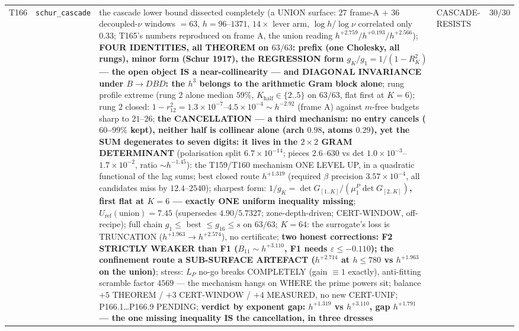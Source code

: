 \documentclass[11pt,a4paper]{article}
\begin{document}
{\begin{xltabular}{\linewidth}{@{}p{0.95cm} >{\raggedright\arraybackslash}p{3.1cm} Y >{\raggedright\scriptsize\arraybackslash}p{3.35cm} p{1.15cm}@{}}
T166 & \texttt{\scriptsize schur\_\allowbreak cascade} & the cascade lower bound dissected completely (a UNION surface: $27$ frame-A $+$ $36$ decoupled-$\nu$ windows $=63$, $h=96$--$1371$, $14\times$ lever arm, $\log h$/$\log\nu$ correlated only $0.33$; T165's numbers reproduced on frame A, the union reading $h^{+2.759}/h^{+0.193}/h^{+2.566}$); \textbf{FOUR IDENTITIES, all THEOREM on $63/63$: prefix (one Cholesky, all rungs), minor form (Schur 1917), the REGRESSION form $g_K/g_1=1/(1-R_K^2)$ --- the open object IS a near-collinearity --- and DIAGONAL INVARIANCE under $B\to DBD$: the $h^3$ belongs to the arithmetic Gram block alone}; rung profile extreme (rung $2$ alone median $59\%$, $K_{\mathrm{half}}\in\{2..5\}$ on $63/63$, flat first at $K=6$); rung $2$ closed: $1-r_{12}^2=1.3\times10^{-7}$--$4.5\times10^{-4}\sim h^{-2.92}$ (frame A) against $m$-free budgets sharp to $21$--$26$; \textbf{the CANCELLATION --- a third mechanism: no entry cancels ($60$--$99\%$ kept), neither half is collinear alone (arch $0.98$, atoms $0.29$), yet the SUM degenerates to seven digits: it lives in the $2\times2$ GRAM DETERMINANT} (polarisation split $6.7\times10^{-14}$; pieces $2.6$--$630$ vs det $1.0\times10^{-3}$--$1.7\times10^{-2}$, ratio $\sim h^{-1.45}$): the T159/T160 mechanism ONE LEVEL UP, in a quadratic functional of the lag sums; best closed route $h^{+1.319}$ (required $\beta$ precision $3.57\times10^{-4}$, all candidates miss by $12.4$--$2540$); sharpest form: \textbf{$1/g_K=\det G_{[1..K]}/(\mu^P_1\det G_{[2..K]})$, first flat at $K=6$ --- exactly ONE uniform inequality missing}; $U_{\mathrm{ref}}(\text{union})=7.45$ (supersedes $4.90$/$5.7327$; zone-depth-driven; CERT-WINDOW, off-recipe); full chain $g_1\le$ best $\le g_{16}\le s$ on $63/63$; $K=64$: the surrogate's loss is TRUNCATION ($h^{+1.963}\to h^{+2.574}$), no certificate; \textbf{two honest corrections: F2 STRICTLY WEAKER than F1 ($B_{11}\sim h^{+3.110}$, F1 needs $\varepsilon\le-0.110$); the confinement route a SUB-SURFACE ARTEFACT ($h^{+2.714}$ at $h\le780$ vs $h^{+1.963}$ on the union)}; stress: $L_P$ no-go breaks COMPLETELY (gain $\equiv1$ exactly), anti-fitting scramble factor $4569$ --- the mechanism hangs on WHERE the prime powers sit; balance $+5$ THEOREM / $+3$ CERT-WINDOW / $+4$ MEASURED, no new CERT-UNIF; P166.1\ldots P166.9 PENDING; \textbf{verdict by exponent gap: $h^{+1.319}$ vs $h^{+3.110}$, gap $h^{+1.791}$ --- the one missing inequality IS the cancellation, in three dresses} & CASCADE-RESISTS & 30/30\\

\end{xltabular}}
\end{document}
